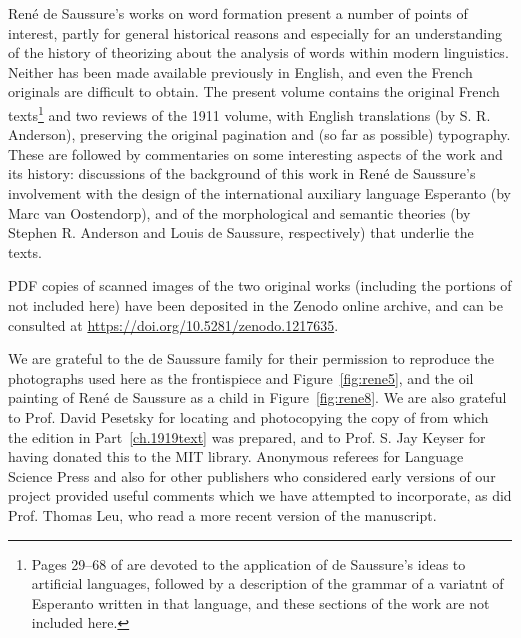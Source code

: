 \begin{refsection}
René de Saussure's works on word formation present a number of points
of interest, partly for general historical reasons and especially for
an understanding of the history of theorizing about the analysis of
words within modern linguistics. Neither has been made available
previously in English, and even the French originals are difficult to
obtain. The present volume contains the original French
texts\footnote{Pages 29--68 of
  \citet{r.desaussure19:structure.logique} are devoted to the
  application of de Saussure's ideas to artificial languages, followed
  by a description of the grammar of a variatnt of Esperanto written
  in that language, and these sections of the work are not included
  here.} and two reviews of the 1911 volume, with English translations
(by S. R. Anderson), preserving the original pagination and (so far as
possible) typography. These are followed by commentaries on some
interesting aspects of the work and its history: discussions of the
background of this work in René de Saussure's involvement with the
design of the international auxiliary language Esperanto (by Marc van
Oostendorp), and of the morphological and semantic theories (by
Stephen R. Anderson and Louis de Saussure, respectively) that underlie
the texts.\pagebreak

PDF copies of scanned images of the two original works (including the
portions of \citealt{r.desaussure19:structure.logique} not included
here) have been deposited in the Zenodo online archive, and can be
consulted at \url{https://doi.org/10.5281/zenodo.1217635}.

We are grateful to the de Saussure family for their permission to
reproduce the photographs used here as the frontispiece and
Figure~\ref{fig:rene5}, and the oil painting of René de Saussure as a
child in Figure~\ref{fig:rene8}. We are also grateful to Prof. David
Pesetsky for locating and photocopying the copy of
\citealt{r.desaussure19:structure.logique} from which the edition in
Part~\ref{ch.1919text} was prepared, and to Prof. S. Jay Keyser for
having donated this to the MIT library. Anonymous referees for
Language Science Press and also for other publishers who considered
early versions of our project provided useful comments which we have
attempted to incorporate, as did Prof. Thomas Leu, who read a more
recent version of the manuscript.

\sloppy
\printbibliography[heading=subbibliography,notkeyword=this] 
\end{refsection}

